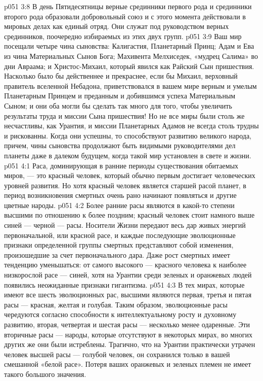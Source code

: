 \vs p051 3:8 В день Пятидесятницы верные срединники первого рода и срединники второго рода образовали добровольный союз и с этого момента действовали в мировых делах как единый отряд. Они служат под руководством верных срединников, поочередно избираемых из этих двух групп.
\vs p051 3:9 \pc Ваш мир посещали четыре чина сыновства: Калигастия, Планетарный Принц; Адам и Ева из чина Материальных Сынов Бога; Махивента Мелхиседек, «мудрец Салима» во дни Авраама; и Христос\hyp{}Михаил, который явился как Райский Сын пришествия. Насколько было бы действеннее и прекраснее, если бы Михаил, верховный правитель вселенной Небадона, приветствовался в вашем мире верным и умелым Планетарным Принцем и преданным и добившимся успеха Материальным Сыном; и они оба могли бы сделать так много для того, чтобы увеличить результаты труда и миссии Сына пришествия! Но не все миры были столь же несчастливы, как Урантия, и миссии Планетарных Адамов не всегда столь трудны и рискованны. Когда они успешны, то способствуют развитию великого народа, причем, чины сыновства продолжают быть видимыми руководителями дел планеты даже в далеком будущем, когда такой мир установлен в свете и жизни.
\vs p051 4:1 Раса, доминирующая в ранние периоды существования обитаемых миров, --- это красный человек, который обычно первым достигает человеческих уровней развития. Но хотя красный человек является старшей расой планет, в период возникновения смертных очень рано начинают появляться и другие цветные народы.
\vs p051 4:2 Более ранние расы являются в какой\hyp{}то степени высшими по отношению к более поздним; красный человек стоит намного выше синей --- черной --- расы. Носители Жизни передают весь дар живых энергий первоначальной, или красной расе, и каждые последующие эволюционные признаки определенной группы смертных представляют собой изменения, произошедшие за счет первоначального дара. Даже рост смертных имеет тенденцию уменьшаться: от самого высокого --- красного человека к наиболее низкорослой расе --- синей, хотя на Урантии среди зеленых и оранжевых людей появились неожиданные признаки гигантизма.
\vs p051 4:3 В тех мирах, которые имеют все шесть эволюционных рас, высшими являются первая, третья и пятая расы --- красная, желтая и голубая. Таким образом, эволюционные расы чередуются согласно способности к интеллектуальному росту и духовному развитию, вторая, четвертая и шестая расы --- несколько менее одаренные. Эти вторичные расы --- народы, которые отсутствуют в некоторых мирах, во многих других же они были истреблены. Трагично, что на Урантии практически утрачен человек высшей расы --- голубой человек, он сохранился только в вашей смешанной «белой расе». Потеря ваших оранжевых и зеленых племен не имеет такого большого значения.
